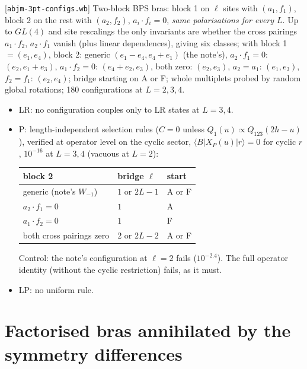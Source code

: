 \documentclass[11pt]{article}
\newcommand{\nb}[1]{\texttt{#1}}
\begin{document}
[\nb{abjm-3pt-configs.wb}] Two-block BPS bras: block 1 on $\ell$ sites with $(a_1,f_1)$, block 2 on the rest with
$(a_2,f_2)$, $a_i\cdot f_i=0$, \emph{same polarisations for every $L$}. Up to $GL(4)$ and site rescalings the only
invariants are whether the cross pairings $a_1\cdot f_2$, $a_2\cdot f_1$ vanish (plus linear dependences), giving six
classes; with block 1 $=(e_1,e_4)$, block 2: generic $(e_1-e_4,e_4+e_1)$ (the note's), $a_2\cdot f_1=0$: $(e_2,e_1+e_3)$,
$a_1\cdot f_2=0$: $(e_4+e_2,e_3)$, both zero: $(e_2,e_3)$, $a_2=a_1$: $(e_1,e_3)$, $f_2=f_1$: $(e_2,e_4)$; bridge starting on A or
F; whole multiplets probed by random global rotations; 180 configurations at $L=2,3,4$.
\begin{itemize}
\item LR: no configuration couples only to LR states at $L=3,4$.
\item P: length-independent selection rules ($C=0$ unless $Q_1(u)\propto Q_{123}(2h-u)$), verified at operator level on the
cyclic sector, $\langle B|X_P(u)|r\rangle=0$ for cyclic $r$, $10^{-16}$ at $L=3,4$ (vacuous at $L=2$):
\begin{center}
\begin{tabular}{lll}
\toprule
block 2 & bridge $\ell$ & start\\
\midrule
generic (note's $W_{-1}$) & $1$ or $2L-1$ & A or F\\
$a_2\cdot f_1=0$ & $1$ & A\\
$a_1\cdot f_2=0$ & $1$ & F\\
both cross pairings zero & $2$ or $2L-2$ & A or F\\
\bottomrule
\end{tabular}
\end{center}
Control: the note's configuration at $\ell=2$ fails ($10^{-2.4}$). The full operator identity (without the cyclic
restriction) fails, as it must.
\item LP: no uniform rule.
\end{itemize}

\section{Factorised bras annihilated by the symmetry differences}\label{sec:fact}
\end{document}
